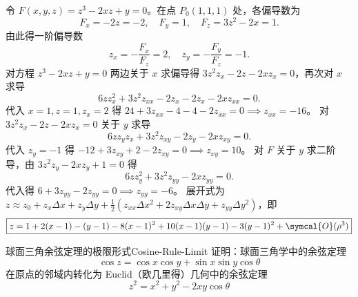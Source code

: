 \begin{solution}
    令 $F(x, y, z) = z^3 - 2xz + y = 0$。在点 $P_0(1, 1, 1)$ 处，各偏导数为
    \begin{equation}
        F_x = -2z = -2, \quad F_y = 1, \quad F_z = 3z^2 - 2x = 1.
    \end{equation}
    由此得一阶偏导数
    \begin{equation}
        z_x = -\frac{F_x}{F_z} = 2, \quad z_y = -\frac{F_y}{F_z} = -1. \label{eq:first-derivative}
    \end{equation}
    对方程 $z^3 - 2xz + y = 0$ 两边关于 $x$ 求偏导得 $3z^2 z_x - 2z - 2xz_x = 0$，再次对 $x$ 求导
    \begin{equation}
        6z z_x^2 + 3z^2 z_{xx} - 2z_x - 2z_x - 2xz_{xx} = 0.
    \end{equation}
    代入 $x=1, z=1, z_x=2$ 得 $24 + 3z_{xx} - 4 - 4 - 2z_{xx} = 0 \implies z_{xx} = -16$。
    对 $3z^2 z_x - 2z - 2xz_x = 0$ 关于 $y$ 求导
    \begin{equation}
        6z z_y z_x + 3z^2 z_{xy} - 2z_y - 2xz_{xy} = 0.
    \end{equation}
    代入 $z_y = -1$ 得 $-12 + 3z_{xy} + 2 - 2z_{xy} = 0 \implies z_{xy} = 10$。
    对 $F$ 关于 $y$ 求二阶导，由 $3z^2 z_y - 2xz_y + 1 = 0$ 得
    \begin{equation}
        6z z_y^2 + 3z^2 z_{yy} - 2xz_{yy} = 0.
    \end{equation}
    代入得 $6 + 3z_{yy} - 2z_{yy} = 0 \implies z_{yy} = -6$。
    展开式为 $z \approx z_0 + z_x \Delta x + z_y \Delta y + \frac{1}{2} (z_{xx} \Delta x^2 + 2z_{xy} \Delta x \Delta y + z_{yy} \Delta y^2)$，即
    \begin{equation}
        \boxed{z = 1 + 2(x - 1) - (y - 1) - 8(x - 1)^2 + 10(x - 1)(y - 1) - 3(y - 1)^2 + \symcal{O}(\rho^3)}
    \end{equation}
\end{solution}

\begin{problem}{球面三角余弦定理的极限形式}{Cosine-Rule-Limit}
    证明：球面三角学中的余弦定理
    \begin{equation}
        \cos z = \cos x \cos y + \sin x \sin y \cos \theta
    \end{equation}
    在原点的邻域内转化为 Euclid（欧几里得）几何中的余弦定理
    \begin{equation}
        z^2 = x^2 + y^2 - 2xy \cos \theta
    \end{equation}
\end{problem}


